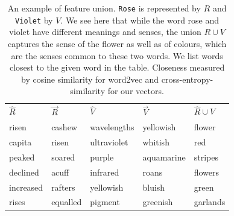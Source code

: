 \documentclass[11pt]{book}
\begin{document}
\begin{table}
  \centering
  {\scriptsize
  \begin{tabular}{l l l l l}
      $\hat R$    & $\vec R$ & $\hat V$       & $\vec V$  & $\hat R \cup \hat V$  \\
      risen       & cashew   & wavelengths    & yellowish & flower                \\
      capita      & risen    & ultraviolet    & whitish   & red                   \\
      peaked      & soared   & purple         & aquamarine& stripes               \\
      declined    & acuff    & infrared       & roans     & flowers               \\
      increased   & rafters  & yellowish      & bluish    & green                 \\
      rises       & equalled & pigment        & greenish  & garlands              \\
  \end{tabular}
  }
  \caption{An example of feature union. \texttt{Rose} is represented by $R$
  and \texttt{Violet} by $V$. We see here that while the word rose and violet
  have different meanings and senses, the union $R \cup V$ captures the sense
  of the flower as well as of colours, which are the senses common to these
  two words. We list words closest to the given word in the table. Closeness
  measured by cosine similarity for word2vec and cross-entropy-similarity for
  our vectors.}
  \label{tab: union}
\end{table}
\end{document}
